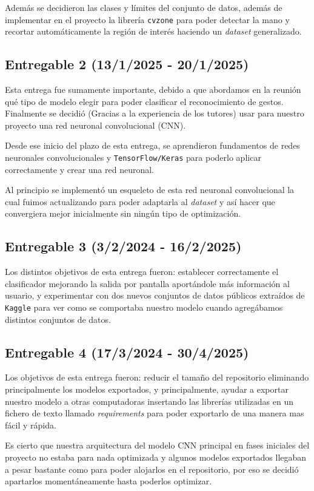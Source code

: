 Además se decidieron las clases y límites del conjunto de datos, además de implementar en el proyecto la librería \texttt{cvzone} para poder detectar la mano y recortar automáticamente la región de interés haciendo un \textit{dataset} generalizado.


\subsection{Entregable 2 (13/1/2025 - 20/1/2025)}
Esta entrega fue sumamente importante, debido a que abordamos en la reunión qué tipo de modelo elegir para poder clasificar el reconocimiento de gestos. Finalmente se decidió (Gracias a la experiencia de los tutores) usar para nuestro proyecto una red neuronal convolucional (CNN). 

Desde ese inicio del plazo de esta entrega, se aprendieron fundamentos de redes neuronales convolucionales y \texttt{TensorFlow/Keras} para poderlo aplicar correctamente y crear una red neuronal.

Al principio se implementó un esqueleto de esta red neuronal convolucional la cual fuimos actualizando para poder adaptarla al \textit{dataset} y así hacer que convergiera mejor inicialmente sin ningún tipo de optimización.


\subsection{Entregable 3 (3/2/2024 - 16/2/2025)}
Los distintos objetivos de esta entrega fueron: establecer correctamente el clasificador mejorando la salida por pantalla aportándole más información al usuario, y experimentar con dos nuevos conjuntos de datos públicos extraídos de \texttt{Kaggle} para ver como se comportaba nuestro modelo cuando agregábamos distintos conjuntos de datos.


\subsection{Entregable 4 (17/3/2024 - 30/4/2025)}
Los objetivos de esta entrega fueron: reducir el tamaño del repositorio eliminando principalmente los modelos exportados, y principalmente, ayudar a exportar nuestro modelo a otras computadoras insertando las librerías utilizadas en un fichero de texto llamado \textit{requirements} para poder exportarlo de una manera mas fácil y rápida.

Es cierto que nuestra arquitectura del modelo CNN principal en fases iniciales del proyecto no estaba para nada optimizada y algunos modelos exportados llegaban a pesar bastante como para poder alojarlos en el repositorio, por eso se decidió apartarlos momentáneamente hasta poderlos optimizar.


